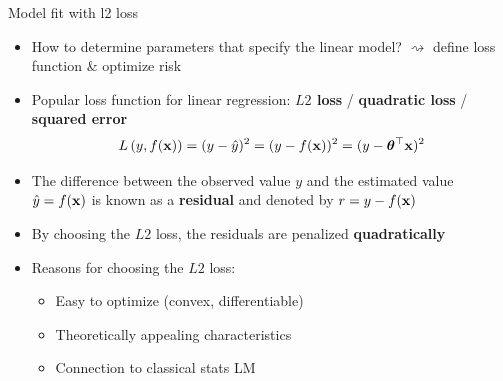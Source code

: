 \documentclass[11pt,compress,t,notes=noshow, xcolor=table]{beamer}
\begin{document}
\begin{vbframe}{Model fit with l2 loss}

\begin{itemize}
    \item How to determine parameters that specify the linear model? $\rightsquigarrow$ define loss function \& optimize risk
    \item Popular loss function for linear regression: \textbf{$L2$ loss} / \textbf{quadratic loss} / 
    \textbf{squared error}
    $$L\left(y, f(\mathbf{x})\right) = (y - \hat{y})^2 = (y-f(\mathbf{x}))^2 = (y-\bm{\theta}^\top \mathbf{x})^2$$
    
    \item The difference between the observed value $y$ and the estimated value $\hat{y} = f(\mathbf{x})$ is known as a \textbf{residual} and denoted by $r = y - f(\mathbf{x})$
    \item By choosing the $L2$ loss, the residuals are penalized \textbf{quadratically}
    \item Reasons for choosing the $L2$ loss:
    \begin{itemize}
        \item Easy to optimize (convex, differentiable)
        \item Theoretically appealing characteristics 
        \item Connection to classical stats LM
    \end{itemize}
\end{itemize}

\end{vbframe}

\end{document}
